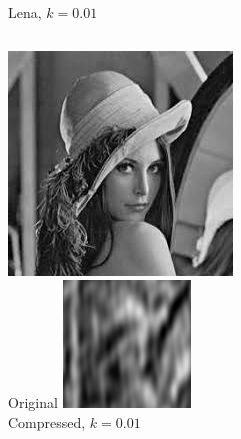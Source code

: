 \documentclass[12pt]{beamer}
\begin{document}
\begin{frame}{Lena, \(k=0.01\)}
  \begin{columns}
      \centering
      \includegraphics[width=\textwidth]{Lena.jpeg}\\
      \footnotesize Original
      \centering
      \includegraphics[width=\textwidth]{Lena_k01.png}\\
      \footnotesize Compressed, \(k=0.01\)
  \end{columns}
\end{frame}
\end{document}

